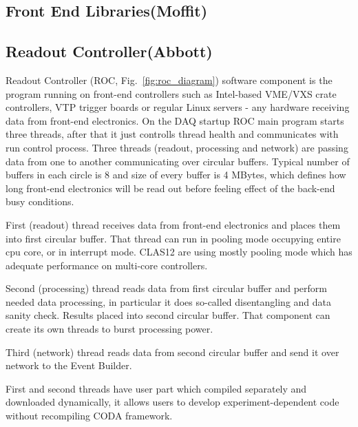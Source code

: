 \subsection{Front End Libraries(Moffit)}




\subsection{Readout Controller(Abbott)}

Readout Controller (ROC, Fig.~\ref{fig:roc_diagram}) software component is the program running on front-end controllers such as Intel-based VME/VXS crate controllers, VTP trigger boards or regular Linux servers - any hardware receiving data from front-end electronics. On the DAQ startup ROC main program starts three threads, after that it just controlls thread health and communicates with run control process. Three threads (readout, processing and network) are passing data from one to another communicating over circular buffers. Typical number of buffers in each circle is 8 and size of every buffer is 4 MBytes, which defines how long front-end electronics will be read out before feeling effect of the back-end busy conditions.

First (readout) thread receives data from front-end electronics and places them into first circular buffer. That thread can run in pooling mode occupying entire cpu core, or in interrupt mode. CLAS12 are using mostly pooling mode which has adequate performance on multi-core controllers.

Second (processing) thread reads data from first circular buffer and perform needed data processing, in particular it does so-called disentangling and data sanity check. Results placed into second circular buffer. That component can create its own threads to burst processing power.

Third (network) thread reads data from second circular buffer and send it over network to the Event Builder.

First and second threads have user part which compiled separately and downloaded dynamically, it allows users to develop experiment-dependent code without recompiling CODA framework.

